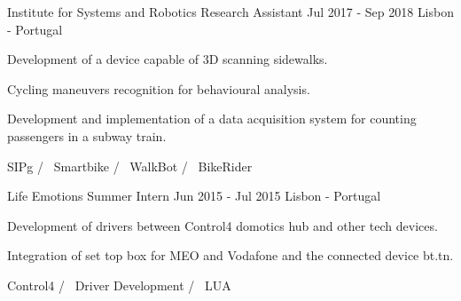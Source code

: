 

\begin{cventries}

  \cventry
    {Institute for Systems and Robotics} %
    {Research Assistant} %
    {Jul 2017 - Sep 2018} %
    {Lisbon - Portugal} %
    {
      \begin{cvitems} %
        \item {Development of a device capable of 3D scanning sidewalks.}
        \item {Cycling maneuvers recognition for behavioural analysis.}
        \item {Development and implementation of a data acquisition system for counting passengers in a subway train.}
      \end{cvitems}
    }
    {
      SIPg /~
      Smartbike /~
      WalkBot /~
      BikeRider ~
    }


  \cventry
    {Life Emotions} %
    {Summer Intern} %
    {Jun 2015 - Jul 2015} %
    {Lisbon - Portugal} %
    {
      \begin{cvitems} %
        \item {Development of drivers between Control4 domotics hub and other tech devices.}
        \item {Integration of set top box for MEO and Vodafone and the connected device bt.tn.}
      \end{cvitems}
    }
    {
      Control4 /~
      Driver Development /~
      LUA ~
    }


\end{cventries}
